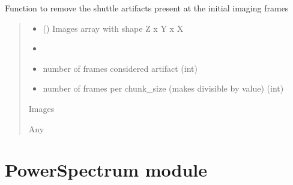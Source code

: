 \documentclass[letterpaper,10pt,english]{sphinxmanual}
\begin{document}

\begin{fulllineitems}
\label{\detokenize{ImageProcessing:ImageProcessing.remove_shuttle_artifact}}
\pysigstartsignatures
{}
\pysigstopsignatures
\sphinxAtStartPar
Function to remove the shuttle artifacts present at the initial imaging frames
\begin{quote}\begin{description}
\begin{itemize}
\item {} 
\sphinxAtStartPar
{} () \textendash{} Images array with shape Z x Y x X

\item {} 
\sphinxAtStartPar
{} \textendash{} 

\item {} 
\sphinxAtStartPar
{} \textendash{} number of frames considered artifact (int)

\item {} 
\sphinxAtStartPar
{} \textendash{} number of frames per chunk\_size (makes divisible by value) (int)

\end{itemize}

\sphinxAtStartPar
Images

\sphinxAtStartPar
Any

\end{description}\end{quote}

\end{fulllineitems}


\sphinxstepscope


\section{PowerSpectrum module}
\label{\detokenize{PowerSpectrum:module-PowerSpectrum}}\label{\detokenize{PowerSpectrum:powerspectrum-module}}\label{\detokenize{PowerSpectrum::doc}}
\sphinxstepscope
\end{document}
